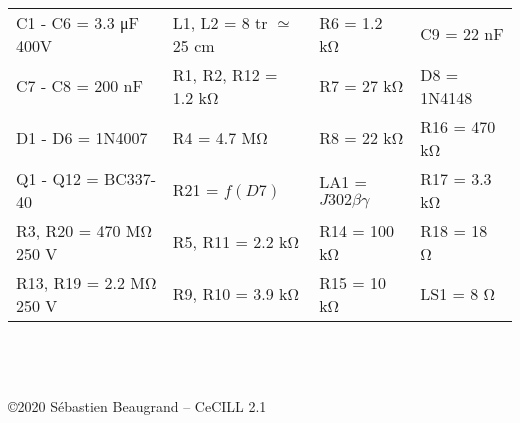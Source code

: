 \documentclass{kicad}
\begin{document}
\begin{center}
~\\
~\\
\hspace*{-4mm}\\
~\\
~\\
\begin{tabular}{llll}
C1 - C6  = 3.3 \si{\micro\farad} 400\si{\volt}&
L1, L2 = 8 tr $\simeq$ 25 \si{\centi\meter}&
R6 = 1.2 \si{\kilo\ohm}&
C9 = 22 \si{\nano\farad}\\
C7 - C8  = 200 \si{\nano\farad}&
R1, R2, R12 = 1.2 \si{\kilo\ohm}&
R7 = 27 \si{\kilo\ohm}&
D8 = 1N4148\\
D1 - D6  = 1N4007&
R4 = 4.7 \si{\mega\ohm}&
R8 = 22 \si{\kilo\ohm}&
R16 = 470 \si{\kilo\ohm}\\
Q1 - Q12 = BC337-40&
R21 = $f(D7)$&
LA1 = $J302\beta\gamma$&
R17 = 3.3 \si{\kilo\ohm}\\
R3, R20 = 470 \si{\mega\ohm} 250 \si{\volt}&
R5, R11 = 2.2 \si{\kilo\ohm}&
R14 = 100 \si{\kilo\ohm}&
R18 = 18 \si{\ohm}\\
R13, R19 = 2.2 \si{\mega\ohm} 250 \si{\volt}&
R9, R10 = 3.9 \si{\kilo\ohm}&
R15 = 10 \si{\kilo\ohm}&
LS1 = 8 \si{\ohm}
\end{tabular}
\\
~\\
\\
\vfill
\scriptsize
\copyright 2020 Sébastien Beaugrand -- CeCILL 2.1
\end{center}
\end{document}
